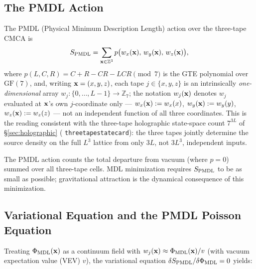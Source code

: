 \documentclass[11pt]{article}
\theoremstyle{remark}
\newcommand{\PHIMDL}{\Phi_{\mathrm{MDL}}}
\newcommand{\lean}[1]{%
  \penalty-100
  \begingroup\def\_{\textunderscore\allowbreak}\texttt{#1}\endgroup}
\newcommand{\CMCA}{\text{CMCA}}
\newcommand{\PMDL}{S_{\rm PMDL}}
\newcommand{\poly}{p(L,C,R)}
\newcommand{\polyform}{C+R-CR-LCR}
\newcommand{\FF}{\mathrm{GF}}
\begin{document}
\subsection{The PMDL Action}

The PMDL (Physical Minimum Description Length) action over the three-tape $\CMCA$
is
\begin{equation}
  \PMDL = \sum_{{\bf x} \in \mathbb{Z}^3}
  p\bigl(w_x({\bf x}),\, w_y({\bf x}),\, w_z({\bf x})\bigr),
  \label{eq:pmdl-action}
\end{equation}
where $\poly = \polyform \pmod{7}$ is the GTE polynomial over $\FF(7)$, and, writing
${\bf x}=(x,y,z)$, each tape $j\in\{x,y,z\}$ is an intrinsically \emph{one-dimensional}
array $w_j:\{0,\ldots,L-1\}\to\mathbb{Z}_7$; the notation $w_j({\bf x})$ denotes $w_j$
evaluated at ${\bf x}$'s own $j$-coordinate only —
$w_x({\bf x}):=w_x(x)$, $w_y({\bf x}):=w_y(y)$, $w_z({\bf x}):=w_z(z)$ — not an
independent function of all three coordinates. This is the reading consistent with the
three-tape holographic state-space count $7^{3L}$ of \S\ref{sec:holographic}
(\lean{three\_tape\_state\_card}): the three tapes jointly determine the source density
on the full $L^3$ lattice from only $3L$, not $3L^3$, independent inputs.

The PMDL action counts the total departure from vacuum (where $p = 0$)
summed over all three-tape cells. MDL minimization requires $\PMDL$ to be
as small as possible; gravitational attraction is the dynamical consequence
of this minimization.

\subsection{Variational Equation and the PMDL Poisson Equation}

Treating $\PHIMDL({\bf x})$ as a continuum field with
$w_j({\bf x}) \approx \PHIMDL({\bf x})/v$ (with vacuum expectation value (VEV)
$v$), the variational equation $\delta\PMDL/\delta\PHIMDL = 0$ yields:
\end{document}
